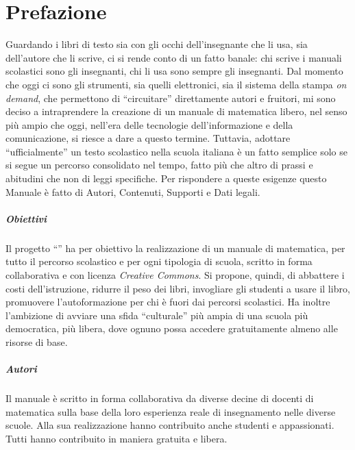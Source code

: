 \pagestyle{matc3page}
\chapter*{Prefazione}
Guardando i libri di testo sia con gli occhi dell'insegnante che li usa, sia dell'autore che li scrive, ci si rende
conto di un fatto banale: chi scrive i manuali scolastici sono gli insegnanti, chi li usa sono sempre gli
insegnanti. Dal momento che oggi ci sono gli strumenti, sia quelli elettronici, sia il sistema della stampa \textit{on demand},
che permettono di ``circuitare'' direttamente autori e fruitori, mi sono deciso a intraprendere la
creazione di un manuale di matematica libero, nel senso più ampio che oggi, nell'era delle tecnologie
dell'informazione e della comunicazione, si riesce a dare a questo termine. Tuttavia, adottare ``ufficialmente'' un
testo scolastico nella scuola italiana è un fatto semplice solo se si segue un percorso consolidato nel tempo,
fatto più che altro di prassi e abitudini che non di leggi specifiche. Per rispondere a queste esigenze questo
Manuale è fatto di Autori, Contenuti, Supporti e Dati legali.

\paragraph{Obiettivi} Il progetto ``\serie'' ha per obiettivo la realizzazione di un manuale di matematica, per
tutto il percorso scolastico e per ogni tipologia di scuola, scritto in forma collaborativa e con licenza \textit{Creative
Commons}. Si propone, quindi, di abbattere i costi dell'istruzione, ridurre il peso dei libri, invogliare gli
studenti a usare il libro, promuovere l'autoformazione
per chi è fuori dai percorsi scolastici. Ha inoltre l'ambizione di avviare una sfida ``culturale'' più
ampia di una scuola più democratica, più libera, dove ognuno possa accedere gratuitamente almeno alle
risorse di base.

\paragraph{Autori} Il manuale è scritto in forma collaborativa da diverse decine di docenti di matematica sulla base
della loro esperienza reale di insegnamento nelle diverse scuole. Alla sua realizzazione hanno contribuito
anche studenti e appassionati. Tutti hanno contribuito in maniera gratuita e libera.

